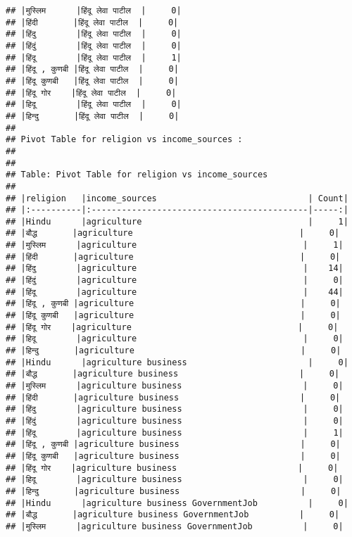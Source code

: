 \documentclass[
]{article}
\begin{document}
\begin{verbatim}
## |मुस्लिम      |हिंदू लेवा पाटील  |     0|
## |हिंदी       |हिंदू लेवा पाटील  |     0|
## |हिंदु        |हिंदू लेवा पाटील  |     0|
## |हिंदुं        |हिंदू लेवा पाटील  |     0|
## |हिंदू        |हिंदू लेवा पाटील  |     1|
## |हिंदू , कुणबी |हिंदू लेवा पाटील  |     0|
## |हिंदू कुणबी   |हिंदू लेवा पाटील  |     0|
## |हिंदू गोर    |हिंदू लेवा पाटील  |     0|
## |हिदू        |हिंदू लेवा पाटील  |     0|
## |हिन्दु       |हिंदू लेवा पाटील  |     0|
## 
## Pivot Table for religion vs income_sources :
## 
## 
## Table: Pivot Table for religion vs income_sources
## 
## |religion   |income_sources                              | Count|
## |:----------|:-------------------------------------------|-----:|
## |Hindu      |agriculture                                 |     1|
## |बौद्ध       |agriculture                                 |     0|
## |मुस्लिम      |agriculture                                 |     1|
## |हिंदी       |agriculture                                 |     0|
## |हिंदु        |agriculture                                 |    14|
## |हिंदुं        |agriculture                                 |     0|
## |हिंदू        |agriculture                                 |    44|
## |हिंदू , कुणबी |agriculture                                 |     0|
## |हिंदू कुणबी   |agriculture                                 |     0|
## |हिंदू गोर    |agriculture                                 |     0|
## |हिदू        |agriculture                                 |     0|
## |हिन्दु       |agriculture                                 |     0|
## |Hindu      |agriculture business                        |     0|
## |बौद्ध       |agriculture business                        |     0|
## |मुस्लिम      |agriculture business                        |     0|
## |हिंदी       |agriculture business                        |     0|
## |हिंदु        |agriculture business                        |     0|
## |हिंदुं        |agriculture business                        |     0|
## |हिंदू        |agriculture business                        |     1|
## |हिंदू , कुणबी |agriculture business                        |     0|
## |हिंदू कुणबी   |agriculture business                        |     0|
## |हिंदू गोर    |agriculture business                        |     0|
## |हिदू        |agriculture business                        |     0|
## |हिन्दु       |agriculture business                        |     0|
## |Hindu      |agriculture business GovernmentJob          |     0|
## |बौद्ध       |agriculture business GovernmentJob          |     0|
## |मुस्लिम      |agriculture business GovernmentJob          |     0|

\end{verbatim}
\end{document}

